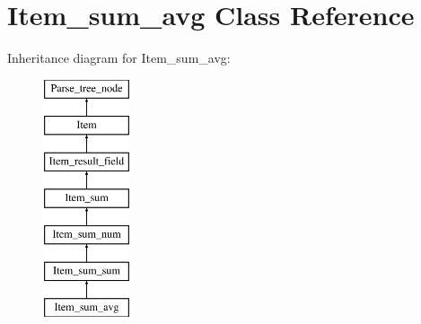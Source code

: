 \hypertarget{classItem__sum__avg}{}\section{Item\+\_\+sum\+\_\+avg Class Reference}
\label{classItem__sum__avg}
Inheritance diagram for Item\+\_\+sum\+\_\+avg\+:\begin{figure}[H]
\begin{center}
\leavevmode
\includegraphics[height=7.000000cm]{classItem__sum__avg}
\end{center}
\end{figure}
